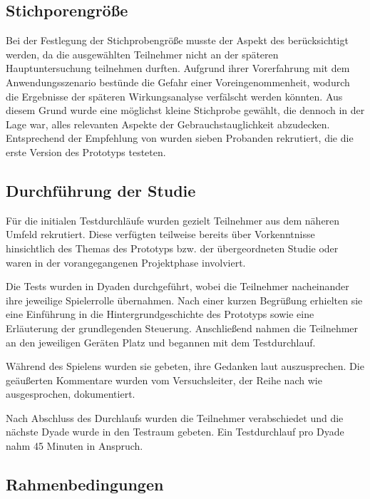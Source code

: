 \subsection{Stichporengröße}\label{sec:pre-study-sample}

Bei der Festlegung der Stichprobengröße musste der Aspekt des  berücksichtigt werden, da die ausgewählten Teilnehmer nicht an der späteren Hauptuntersuchung teilnehmen durften. Aufgrund ihrer Vorerfahrung mit dem Anwendungsszenario bestünde die Gefahr einer Voreingenommenheit, wodurch die Ergebnisse der späteren Wirkungsanalyse verfälscht werden könnten. Aus diesem Grund wurde eine möglichst kleine Stichprobe gewählt, die dennoch in der Lage war, alles relevanten Aspekte der Gebrauchstauglichkeit abzudecken. Entsprechend der Empfehlung von \citet[S. 3088]{turner_determining_2006} wurden sieben Probanden rekrutiert, die die erste Version des Prototyps testeten.

\subsection{Durchführung der Studie}

Für die initialen Testdurchläufe wurden gezielt Teilnehmer aus dem näheren Umfeld rekrutiert. Diese verfügten teilweise bereits über Vorkenntnisse hinsichtlich des Themas des Prototyps bzw. der übergeordneten Studie oder waren in der vorangegangenen Projektphase involviert.

Die Tests wurden in Dyaden durchgeführt, wobei die Teilnehmer nacheinander ihre jeweilige Spielerrolle übernahmen. Nach einer kurzen Begrüßung erhielten sie eine Einführung in die Hintergrundgeschichte des Prototyps sowie eine Erläuterung der grundlegenden Steuerung. Anschließend nahmen die Teilnehmer an den jeweiligen Geräten Platz und begannen mit dem Testdurchlauf.

Während des Spielens wurden sie gebeten, ihre Gedanken laut auszusprechen. Die geäußerten Kommentare wurden vom Versuchsleiter, der Reihe nach wie ausgesprochen, dokumentiert.

Nach Abschluss des Durchlaufs wurden die Teilnehmer verabschiedet und die nächste Dyade wurde in den Testraum gebeten. Ein Testdurchlauf pro Dyade nahm 45 Minuten in Anspruch.

\subsection{Rahmenbedingungen}\label{sec:pre-study-rahmen}

